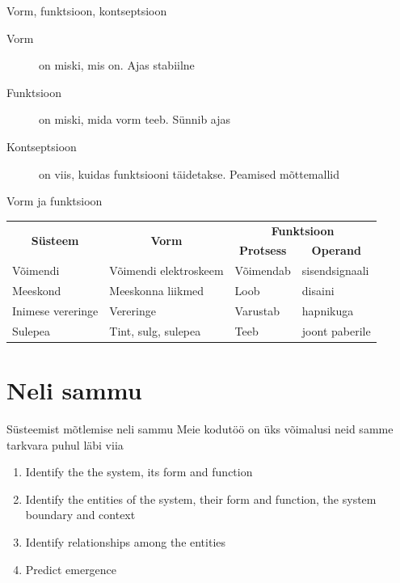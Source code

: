 \documentclass{beamer}
\begin{document}
\begin{frame}{Vorm, funktsioon, kontseptsioon}
	\begin{description}
		\item[Vorm] on miski, mis on. Ajas stabiilne
		\item[Funktsioon] on miski, mida vorm teeb. Sünnib ajas
		\item[Kontseptsioon] on viis, kuidas funktsiooni täidetakse. Peamised mõttemallid
	\end{description}
\end{frame}

\begin{frame}{Vorm ja funktsioon}
\begin{table}
\small
\begin{tabular}{|l|l|l|l|}
\hline
\multicolumn{1}{|c|}{\multirow{2}{*}{\textbf{Süsteem}}} & \multicolumn{1}{c|}{\multirow{2}{*}{\textbf{Vorm}}} & \multicolumn{2}{c|}{\textbf{Funktsioon}} \\ \cline{3-4} 
\multicolumn{1}{|c|}{} & \multicolumn{1}{c|}{} & \multicolumn{1}{c|}{\textbf{Protsess}} & \multicolumn{1}{c|}{\textbf{Operand}} \\ \hline
Võimendi & Võimendi elektroskeem & Võimendab & sisendsignaali \\ \hline
Meeskond & Meeskonna liikmed & Loob & disaini \\ \hline
Inimese vereringe & Vereringe & Varustab & hapnikuga \\ \hline
Sulepea & Tint, sulg, sulepea & Teeb & joont paberile \\ \hline
\end{tabular}\end{table}
\end{frame}

\section{Neli sammu}

\begin{frame}{Süsteemist mõtlemise neli sammu}
	Meie kodutöö on üks võimalusi neid samme tarkvara puhul läbi viia
	
		\begin{enumerate}
			\item Identify the the system, its form and function
			\item Identify the entities of the system, their form and function, the system boundary and context
			\item Identify relationships among the entities
			\item Predict emergence
		\end{enumerate}
\cite{crawley2015system}
\end{frame}
\end{document}
